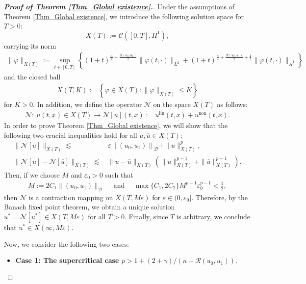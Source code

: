 \documentclass[11pt,reqno]{amsart}
\begin{document}
\begin{proof}[\textbf{Proof of Theorem \ref{Thm_Global existence}.}]
Under the assumptions of Theorem \ref{Thm_Global existence}, we introduce the following solution space for $T > 0$: $$X(T):=\mathcal{C}([0,T],H^1),$$ carrying its norm
\begin{align*}
\|\varphi\|_{X(T)}:=\sup\limits_{t\in[0,T]}\left\{(1+t)^{\frac{n}{4}+\frac{\mathcal{R}(u_0, u_1)}{2}}\|\varphi(t,\cdot)\|_{L^2}  +(1+t)^{\frac{n}{4}+\frac{\mathcal{R}(u_0, u_1)}{2}+\frac{1}{2}}\|\varphi(t,\cdot)\|_{\dot{H}^1}\right\}
\end{align*}
and the closed ball
     \begin{align*}
         X(T, K) := \left\{\varphi \in X(T) : \|\varphi\|_{X(T)} \leq K\right\}
     \end{align*}
     for $K > 0$.
In addition, we define the operator $\mathcal{N}$ on the space $X(T)$ as follows:
\begin{align*}
\mathcal{N}:\ u(t,x)\in X(T)\to \mathcal{N}[u](t,x):=u^{\text{lin}} (t,x)+u^{\text{non}}(t,x).
\end{align*}
In order to prove Theorem \ref{Thm_Global existence}, we will show that the following two crucial inequalities hold for all $u, \bar{u} \in X(T)$:
\begin{align} \label{Cruc-01}
\|\mathcal{N}[u]\|_{X(T)}\lesssim & \,\varepsilon\left\|\left(u_0, u_1\right)\right\|_{\mathcal{D}}+\|u\|_{X(T)}^p,\\
\label{Cruc-02} \|\mathcal{N}[u]-\mathcal{N}[\bar{u}]\|_{X(T)}\lesssim &\,\|u-\bar{u}\|_{X(T)}\left(\|u\|_{X(T)}^{p-1}+\|\bar{u}\|_{X(T)}^{p-1}\right).
\end{align}
Then, if we choose $M$ and $\varepsilon_0 > 0$ such that
     \begin{align*}
         M:=  2C_1\|(u_0, u_1)\|_{\mathcal{D}} \quad\text{ and }\quad \max\{C_1, 2C_2\} M^{p-1} \varepsilon_0^{p-1} < \frac{1}{2},
     \end{align*}
      then $\mathcal{N}$ is a contraction mapping on $X(T, M\varepsilon)$ for $\varepsilon \in (0, \varepsilon_0]$. Therefore, by the Banach fixed point theorem, we obtain a unique solution $u^* = \mathcal{N}[u^*] \in X(T, M\varepsilon)$ for all $T > 0$. Finally, since $T$ is arbitrary, we conclude that $u^* \in X(\infty, M\varepsilon)$.
 
 Now, we consider the following two cases:

\begin{itemize}
[leftmargin=*]
    \item \noindent \textbf{Case 1: The supercritical case $p> 1 + (2+\gamma)/(n+\mathcal{R}(u_0, u_1)) $}.


\end{itemize}
\end{proof}
\end{document}

